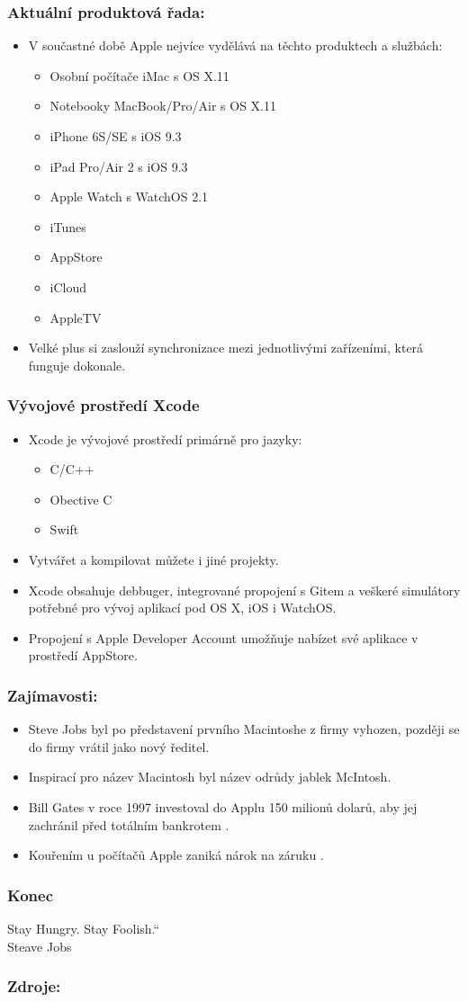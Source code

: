 \documentclass{beamer}
\providecommand{\uv}[1]{\quotedblbase #1\textquotedblleft}
\begin{document}
\begin{frame}
\frametitle{Aktuální produktová řada:}
\begin{itemize}
 \item V součastné době Apple nejvíce vydělává na těchto produktech a službách:
 	\begin{itemize}
	\item Osobní počítače iMac s OS X.11
	\item Notebooky MacBook/Pro/Air s OS X.11
	\item iPhone 6S/SE s iOS 9.3
	\item iPad Pro/Air 2 s iOS 9.3
	\item Apple Watch s WatchOS 2.1
	\item iTunes
	\item AppStore
	\item iCloud
	\item AppleTV
	\end{itemize}
 \item Velké plus si zaslouží synchronizace mezi jednotlivými zařízeními, která funguje dokonale.
\end{itemize}
\end{frame}

\begin{frame}
\frametitle{Vývojové prostředí Xcode}
\begin{itemize}
 \item Xcode je vývojové prostředí primárně pro jazyky: 
 	\begin{itemize}
	\item C/C++
	\item Obective C
	\item Swift
	\end{itemize}
 \item Vytvářet a kompilovat můžete i jiné projekty.
 \item Xcode obsahuje debbuger, integrované propojení s Gitem a veškeré simulátory potřebné pro vývoj aplikací pod OS X, iOS i WatchOS.
 \item Propojení s Apple Developer Account umožňuje nabízet své aplikace v prostředí AppStore.
\end{itemize}
\end{frame}

\begin{frame}
\frametitle{Zajímavosti:}
\begin{itemize}
 \item Steve Jobs byl po představení prvního Macintoshe z firmy vyhozen, později se do firmy vrátil jako nový ředitel.
 \item Inspirací pro název Macintosh byl název odrůdy jablek McIntosh.
 \item Bill Gates v roce 1997 investoval do Applu 150 milionů dolarů, aby jej zachránil před totálním bankrotem \cite{Tarifomat:Zajimavosti}.
 \item Kouřením u počítačů Apple zaniká nárok na záruku \cite{Tarifomat:Zajimavosti}.
\end{itemize}
\end{frame}

\begin{frame}
\frametitle{Konec}
\center
	\uv{ Stay Hungry. Stay Foolish.}\\ 
	 Steave Jobs
\end{frame}

\begin{frame}
 \frametitle{Zdroje:}
 
\end{frame}
\end{document}
